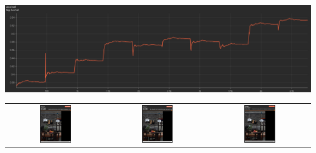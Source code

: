 \documentclass{article}
\begin{document}
\includegraphics[width=\textwidth]{q2.6_4.png}
\begin{tabular}{ccc}
    \includegraphics[width=0.33\textwidth]{q2.6_5.png} &
    \includegraphics[width=0.33\textwidth]{q2.6_6.png} &
    \includegraphics[width=0.33\textwidth]{q2.6_7.png} \\

\end{tabular}
\end{document}
